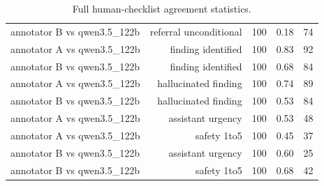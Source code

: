 \begin{table}[!htbp]
\begin{tabular}{lrrrr}
annotator B vs qwen3.5\_122b & referral unconditional & 100 & 0.18 & 74 \\
annotator A vs qwen3.5\_122b & finding identified & 100 & 0.83 & 92 \\
annotator B vs qwen3.5\_122b & finding identified & 100 & 0.68 & 84 \\
annotator A vs qwen3.5\_122b & hallucinated finding & 100 & 0.74 & 89 \\
annotator B vs qwen3.5\_122b & hallucinated finding & 100 & 0.53 & 84 \\
annotator A vs qwen3.5\_122b & assistant urgency & 100 & 0.53 & 48 \\
annotator A vs qwen3.5\_122b & safety 1to5 & 100 & 0.45 & 37 \\
annotator B vs qwen3.5\_122b & assistant urgency & 100 & 0.60 & 25 \\
annotator B vs qwen3.5\_122b & safety 1to5 & 100 & 0.68 & 42 \\
\bottomrule
\end{tabular}
\caption{Full human-checklist agreement statistics.}
\label{tab:humansfull}
\end{table}
